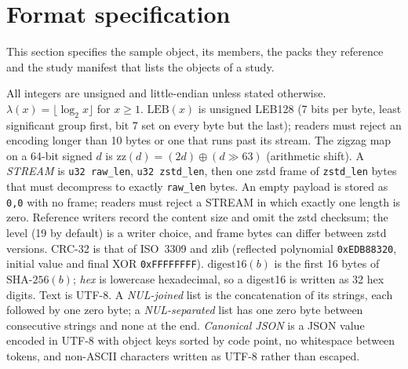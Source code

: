 %
\section{Format specification}
\label{spec:sec}\label{sec:spec}

This section specifies the \sone{} sample object, its members, the packs they reference and the study manifest that
lists the objects of a study.

All integers are unsigned and little-endian unless stated otherwise. $\lambda(x)=\lfloor\log_2 x\rfloor$ for $x\ge 1$.
$\mathrm{LEB}(x)$ is unsigned LEB128 (7 bits per byte, least significant group first, bit 7 set on every byte but
the last); readers must reject an encoding longer than 10 bytes or one that runs past its stream. The zigzag map on a
64-bit signed $d$ is $\mathrm{zz}(d)=(2d)\oplus(d\gg 63)$ (arithmetic shift). A \emph{STREAM} is
\texttt{u32 raw\_len}, \texttt{u32 zstd\_len}, then one zstd frame of \texttt{zstd\_len} bytes that must decompress to
exactly \texttt{raw\_len} bytes. An empty payload is stored as \texttt{0,0} with no frame; readers must reject a STREAM
in which exactly one length is zero. Reference writers record the content size and omit the zstd
checksum; the level (19 by default) is a writer choice, and frame bytes can differ between zstd versions.
CRC-32 is that of ISO~3309 and zlib (reflected polynomial \texttt{0xEDB88320}, initial value and final XOR
\texttt{0xFFFFFFFF}). $\mathrm{digest16}(b)$ is the first 16 bytes of $\mathrm{SHA\text{-}256}(b)$; \emph{hex} is
lowercase hexadecimal, so a digest16 is written as 32 hex digits. Text is UTF-8. A \emph{NUL-joined} list is the
concatenation of its strings, each followed by one zero byte; a \emph{NUL-separated} list has one zero byte between
consecutive strings and none at the end. \emph{Canonical JSON} is a JSON value encoded in UTF-8 with object keys sorted
by code point, no whitespace between tokens, and non-ASCII characters written as UTF-8 rather than escaped.

